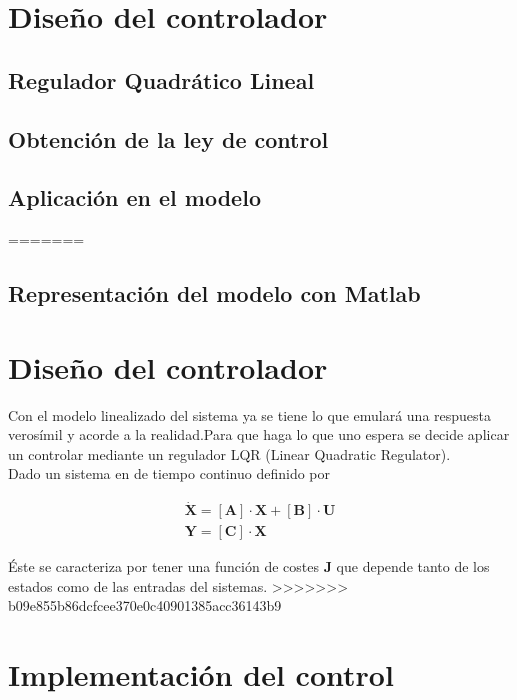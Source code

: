 \documentclass[twoside]{article}
\begin{document}
\newpage
\section{Diseño del controlador} \label{control}
\subsection{Regulador Quadrático Lineal}
\subsection{Obtención de la ley de control}
\subsection{Aplicación en el modelo}
=======
\subsection{Representación del modelo con Matlab}

\newpage
\section{Diseño del controlador} \label{control}

Con el modelo linealizado del sistema ya se tiene lo que emulará una respuesta verosímil y acorde a la realidad.Para que haga lo que uno espera  se decide aplicar un controlar mediante un regulador LQR (Linear Quadratic Regulator). \\

Dado un sistema en de tiempo continuo definido por 

\begin{equation}
\begin{array}{l}
\pmb{\dot{X}}=[\pmb{A}] \cdot \pmb{X} + [\pmb{B}] \cdot \pmb{U} \\
\pmb{Y} = [\pmb{C}] \cdot \pmb{X} 
\end{array}
\end{equation} 



Éste se caracteriza por tener una función de costes $\mathbf{J}$ que depende tanto de los estados como de las entradas del sistemas.
>>>>>>> b09e855b86dcfcee370e0c40901385acc36143b9

\newpage
\section{Implementación del control} \label{implement}
\end{document}
